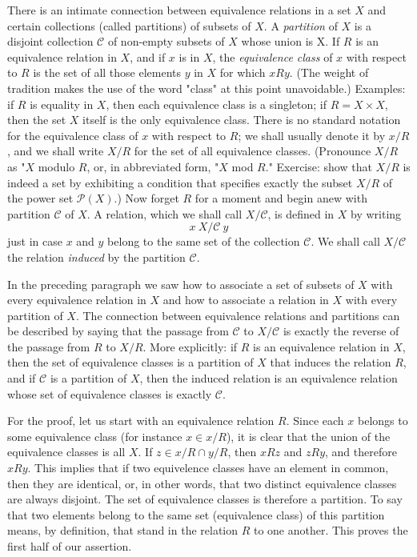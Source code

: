There is an intimate connection between equivalence relations in a set $X$ and certain collections (called partitions) of subsets of $X$. A \textit{partition} of $X$ is a disjoint collection $ \mathcal{C} $ of non-empty subsets of $X$ whose union is X. If $R$ is an equivalence relation in $X$, and if $x$ is in $X$, the \textit{equivalence class} of $x$ with respect to $R$ is the set of all those elements $y$ in $X$ for which $x R y$. (The weight of tradition makes the use of the word "class" at this point unavoidable.) Examples: if $ R$ is equality in $X$, then each equivalence class is a singleton; if $R =  X \times X$, then the set $X$ itself is the only equivalence class. There is no standard notation for the equivalence class of $x$ with respect to $R$; we shall usually denote it by $x/ R$, and we shall write $X/ R$ for the set of all equivalence classes. (Pronounce $X/ R$ as "$X$ modulo $R$, or, in abbreviated form, "$X$ mod $R$." Exercise: show that $X/ R$ is indeed a set by exhibiting a condition that specifies exactly the subset $X/ R$ of the power set $\mathcal{P}(X)$.) Now forget $R$ for a moment and begin anew with partition $\mathcal{C}$ of $X$. A relation, which we shall call $X/ \mathcal{C}$, is defined in $X$ by writing
\begin{equation*}
x \: X/ \mathcal{C} \: y
\end{equation*}
just in case $x$ and $y$ belong to the same set of the collection $\mathcal{C}$. We shall call $X/ \mathcal{C}$ the relation \textit{induced} by the partition $\mathcal{C}$.

In the preceding paragraph we saw how to associate a set of subsets of $X$ with every equivalence relation in $X$ and how to associate a relation in $X$ with every partition of $X$. The connection between equivalence relations and partitions can be described by saying that the passage from $\mathcal{C}$ to $X/ \mathcal{C}$ is exactly the reverse of the passage from $R$ to $X/ R$. More explicitly: if $R$ is an equivalence relation in $X$, then the set of equivalence classes is a partition of $X$ that induces the relation $R$, and if $\mathcal{C}$ is a partition of $X$, then the induced relation is an equivalence relation whose set of equivalence classes is exactly $\mathcal{C}$. 

For the proof, let us start with an equivalence relation $R$. Since each $x$ belongs to some equivalence class (for instance $x \in x/ R$), it is clear that the union of the equivalence classes is all $X$. If $z \in x/ R \cap y/ R$, then $x R z$ and $z R y$, and therefore $x R y$. This implies that if two equivelence classes have an element in common, then they are identical, or, in other words, that two distinct  equivalence classes are always disjoint. The set of equivalence classes is therefore a partition. To say that two elements belong to the same set (equivalence class) of this partition means, by definition, that stand in the relation $R$ to one another. This proves the first half of our assertion. 

